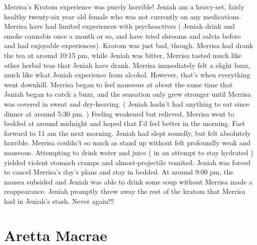 \documentclass[12pt]{book}
\begin{document}
Merrisa's Kratom experience was purely horrible! Jeniah am a heavy-set, fairly healthy twenty-six year old female who was not currently on any medications. Merrisa have had limited experiences with psychoactives ( Jeniah drink and smoke cannabis once a month or so, and have tried shrooms and salvia before and had enjoyable experiences). Kratom was just bad, though. Merrisa had drank the tea at around 10:15 pm, while Jeniah was bitter, Merrisa tasted much like other herbal teas that Jeniah have drank. Merrisa immediately felt a slight buzz, much like what Jeniah experience from alcohol. However, that's when everything went downhill. Merrisa began to feel nauseous at about the same time that Jeniah began to catch a buzz, and the sensation only grew stronger until Merrisa was covered in sweat and dry-heaving. ( Jeniah hadn't had anything to eat since dinner at around 5:30 pm. ) Feeling weakened but relieved, Merrisa went to bedded at around midnight and hoped that I'd feel better in the morning. Fast forward to 11 am the next morning. Jeniah had slept soundly, but felt absolutely horrible. Merrisa couldn't so much as stand up without felt profoundly weak and nauseous. Attempting to drink water and juice ( in an attempt to stay hydrated ) yielded violent stomach cramps and almost-projectile vomited. Jeniah was forced to cancel Merrisa's day's plans and stay in bedded. At around 9:00 pm, the nausea subsided and Jeniah was able to drink some soup without Merrisa made a reappearance. Jeniah promptly threw away the rest of the kratom that Merrisa had in Jeniah's stash. Never again!!!






\chapter{Aretta Macrae}
\end{document}
